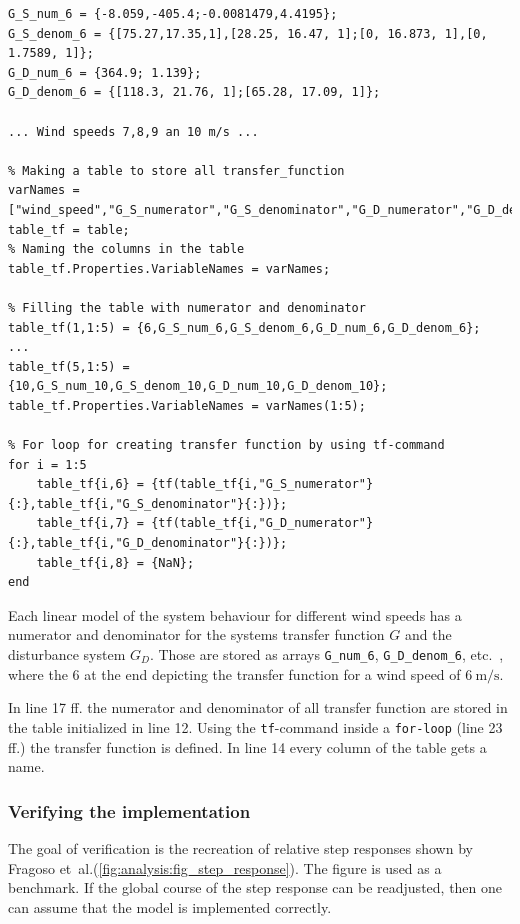 \begin{lstlisting}[style=Matlab-editor,caption={},captionpos=b,label={list:analysis:tf}]
% Wind speed: 6 m/s
G_S_num_6 = {-8.059,-405.4;-0.0081479,4.4195};
G_S_denom_6 = {[75.27,17.35,1],[28.25, 16.47, 1];[0, 16.873, 1],[0, 1.7589, 1]};
G_D_num_6 = {364.9; 1.139};
G_D_denom_6 = {[118.3, 21.76, 1];[65.28, 17.09, 1]};

... Wind speeds 7,8,9 an 10 m/s ...

% Making a table to store all transfer_function
varNames = ["wind_speed","G_S_numerator","G_S_denominator","G_D_numerator","G_D_denominator","G_S","G_D","RGA"];
table_tf = table;
% Naming the columns in the table
table_tf.Properties.VariableNames = varNames;

% Filling the table with numerator and denominator
table_tf(1,1:5) = {6,G_S_num_6,G_S_denom_6,G_D_num_6,G_D_denom_6};
...
table_tf(5,1:5) = {10,G_S_num_10,G_S_denom_10,G_D_num_10,G_D_denom_10};
table_tf.Properties.VariableNames = varNames(1:5);

% For loop for creating transfer function by using tf-command
for i = 1:5
    table_tf{i,6} = {tf(table_tf{i,"G_S_numerator"}{:},table_tf{i,"G_S_denominator"}{:})};
    table_tf{i,7} = {tf(table_tf{i,"G_D_numerator"}{:},table_tf{i,"G_D_denominator"}{:})};
    table_tf{i,8} = {NaN};
end
\end{lstlisting}

Each linear model of the system behaviour for different wind speeds has a numerator and denominator for the systems transfer function $G$ and the disturbance system $G_D$.
Those are stored as arrays \texttt{G\_num\_6}, \texttt{G\_D\_denom\_6}, etc.~, where the 6 at the end depicting the transfer function for a wind speed of $\SI{6}{\metre \per \second}$.

In line 17 ff. the numerator and denominator of all transfer function are stored in the table initialized in line 12.
Using the \texttt{tf}-command inside a \texttt{for-loop} (line 23 ff.) the transfer function is defined.
In line 14 every column of the table gets a name.

\subsubsection{Verifying the implementation}

The goal of verification is the recreation of relative step responses shown by Fragoso et~al.(\autoref{fig:analysis:fig_step_response}).
The figure is used as a benchmark.
If the global course of the step response can be readjusted, then one can assume that the model is implemented correctly.

